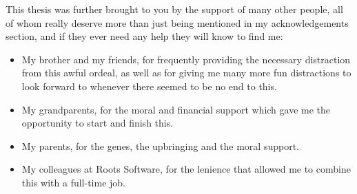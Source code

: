   This thesis was further brought to you by the support of many other people,
  all of whom really deserve more than just being mentioned in my
  acknowledgements section, and if they ever need any help they will know to find
  me:
  \begin{itemize}
   \item My brother and my friends, for frequently providing the necessary distraction from this awful ordeal, as well as for giving me many more fun distractions to look forward to whenever there seemed to be no end to this.
   \item My grandparents, for the moral and financial support which gave me the opportunity to start and finish this.%
   \item My parents, for the genes, the upbringing and the moral support.%
   \item My colleagues at Roots Software, for the lenience that allowed me to combine this with a full-time job.%
  \end{itemize}

